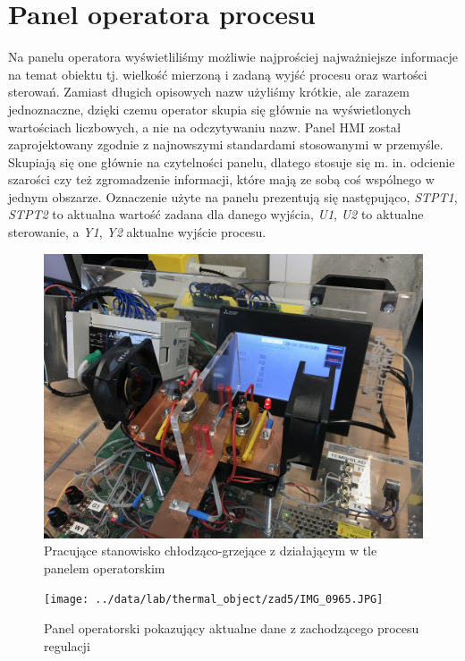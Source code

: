 \chapter{Panel operatora procesu}
\label{thermal_panel}
Na panelu operatora wyświetliliśmy możliwie najprościej najważniejsze informacje na temat obiektu tj. wielkość mierzoną i zadaną wyjść procesu oraz wartości sterowań. Zamiast długich opisowych nazw użyliśmy krótkie, ale zarazem jednoznaczne, dzięki czemu operator skupia się głównie na wyświetlonych wartościach liczbowych, a nie na odczytywaniu nazw. Panel HMI został zaprojektowany zgodnie z najnowszymi standardami stosowanymi w przemyśle. Skupiają się one głównie na czytelności panelu, dlatego stosuje się m. in. odcienie szarości czy też zgromadzenie informacji, które mają ze sobą coś wspólnego w jednym obszarze. Oznaczenie użyte na panelu prezentują się następująco, \textit{STPT1}, \textit{STPT2} to aktualna wartość zadana dla danego wyjścia, \textit{U1}, \textit{U2} to aktualne sterowanie, a \textit{Y1}, \textit{Y2} aktualne wyjście procesu. 

\begin{figure}[H]
\includegraphics[scale=0.09]{../data/lab/thermal_object/zad5/IMG_0964.JPG}
\caption{Pracujące stanowisko chłodząco-grzejące z działającym w tle panelem operatorskim}
\end{figure}

\begin{figure}[H]
\texttt{[image: ../data/lab/thermal\_object/zad5/IMG\_0965.JPG]}
\caption{Panel operatorski pokazujący aktualne dane z zachodzącego procesu regulacji}
\end{figure}


